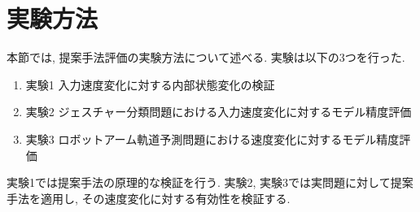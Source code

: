 \section{実験方法}
本節では, 提案手法評価の実験方法について述べる.
実験は以下の3つを行った.
\begin{enumerate}
    \item 実験1 入力速度変化に対する内部状態変化の検証
    \item 実験2 ジェスチャー分類問題における入力速度変化に対するモデル精度評価
    \item 実験3 ロボットアーム軌道予測問題における速度変化に対するモデル精度評価
\end{enumerate}

実験1では提案手法の原理的な検証を行う.
実験2, 実験3では実問題に対して提案手法を適用し, その速度変化に対する有効性を検証する.





